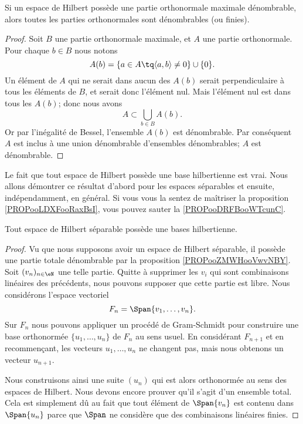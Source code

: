 \begin{proposition}      \label{PROPooENTIooIplRAS}
    Si un espace de Hilbert possède une partie orthonormale maximale dénombrable, alors toutes les parties orthonormales sont dénombrables (ou finies).
\end{proposition}

\begin{proof}
    Soit \( B\) une partie orthonormale maximale, et \( A\) une partie orthonormale. Pour chaque \( b\in B\) nous notons
    \begin{equation}
        A(b)=\{ a\in A\tq \langle a, b\rangle \neq 0 \}\cup\{ 0 \}.
    \end{equation}
    Un élément de \( A\) qui ne serait dans aucun des \( A(b)\) serait perpendiculaire à tous les éléments de \( B\), et serait donc l'élément nul. Mais l'élément nul est dans tous les \( A(b)\); donc nous avons
    \begin{equation}
        A\subset\bigcup_{b\in B}A(b).
    \end{equation}
    Or par l'inégalité de Bessel, l'ensemble \( A(b)\) est dénombrable. Par conséquent \( A\) est inclus à une union dénombrable d'ensembles dénombrables; \( A\) est dénombrable.
\end{proof}

Le fait que tout espace de Hilbert possède une base hilbertienne est vrai. Nous allons démontrer ce résultat d'abord pour les espaces séparables et ensuite, indépendamment, en général. Si vous vous la sentez de maîtriser la proposition \ref{PROPooLDXFooRaxBsI}, vous pouvez sauter la \ref{PROPooDRFBooWTcunC}.
\begin{proposition}     \label{PROPooDRFBooWTcunC}
    Tout espace de Hilbert séparable possède une bases hilbertienne.
\end{proposition}

\begin{proof}
    Vu que nous supposons avoir un espace de Hilbert séparable, il possède une partie totale dénombrable par la proposition \ref{PROPooZMWHooVwvNBY}. Soit  \( (v_n)_{n\in \eN}\) une telle partie. Quitte à supprimer les \( v_i\) qui sont combinaisons linéaires des précédents, nous pouvons supposer que cette partie est libre. Nous considérons l'espace vectoriel
    \begin{equation}
        F_n=\Span\{ v_1,\ldots, v_n \}.
    \end{equation}
    Sur \( F_n\) nous pouvons appliquer un procédé de Gram-Schmidt pour construire une base orthonormée \( \{ u_1,\ldots, u_n \}\) de \( F_n\) au sens usuel. En considérant \( F_{n+1}\) et en recommençant, les vecteurs \( u_1,\ldots, u_n\) ne changent pas, mais nous obtenons un vecteur \( u_{n+1}\).

    Nous construisons ainsi une suite \( (u_n)\) qui est alors orthonormée au sens des espaces de Hilbert. Nous devons encore prouver qu'il s'agit d'un ensemble total. Cela est simplement dû au fait que tout élément de \( \Span\{ v_n \}\) est contenu dans \( \Span\{ u_n \}\) parce que \( \Span\) ne considère que des combinaisons linéaires finies.
\end{proof}

